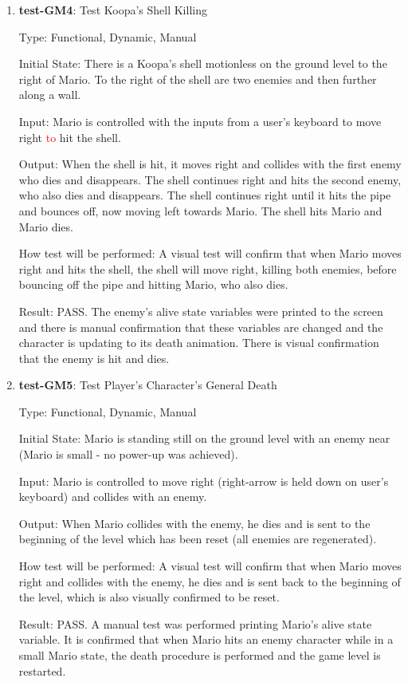 \documentclass[12pt, titlepage]{article}
\begin{document}
\begin{enumerate}
\item{\textbf{test-GM4}: Test Koopa's Shell Killing\\}

Type: Functional, Dynamic, Manual
					
Initial State: There is a Koopa's shell motionless on the ground level to the right of Mario. To the right of the shell are two enemies and then further along a wall.
					
Input: Mario is controlled with the inputs from a user's keyboard to move right \textcolor{red}{to} hit the shell.
					
Output: When the shell is hit, it moves right and collides with the first enemy who dies and disappears. The shell continues right and hits the second enemy, who also dies and disappears. The shell continues right until it hits the pipe and bounces off, now moving left towards Mario. The shell hits Mario and Mario dies.
					
How test will be performed: A visual test will confirm that when Mario moves right and hits the shell, the shell will move right, killing both enemies, before bouncing off the pipe and hitting Mario, who also dies.

Result: PASS. The enemy's alive state variables were printed to the screen and there is manual confirmation that these variables are changed and the character is updating to its death animation. There is visual confirmation that the enemy is hit and dies.

\item{\textbf{test-GM5}: Test Player's Character's General Death\\}

Type: Functional, Dynamic, Manual
					
Initial State: Mario is standing still on the ground level with an enemy near (Mario is small - no power-up was achieved).
					
Input: Mario is controlled to move right (right-arrow is held down on user's keyboard) and collides with an enemy.
					
Output: When Mario collides with the enemy, he dies and is sent to the beginning of the level which has been reset (all enemies are regenerated).
					
How test will be performed: A visual test will confirm that when Mario moves right and collides with the enemy, he dies and is sent back to the beginning of the level, which is also visually confirmed to be reset.

Result: PASS. A manual test was performed printing Mario's alive state variable. It is confirmed that when Mario hits an enemy character while in a small Mario state, the death procedure is performed and the game level is restarted.


\end{enumerate}
\end{document}
